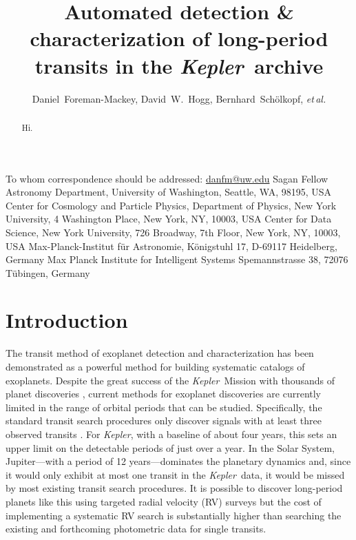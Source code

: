 \documentclass[12pt,preprint]{aastex}
\newcommand{\project}[1]{\textsl{#1}}
\newcommand{\kepler}{\project{Kepler}}
\newcommand{\foreign}[1]{\emph{#1}}
\newcommand{\etal}{\foreign{et\,al.}}
\begin{document}
\title{%
Automated detection \& characterization of long-period transits in the
\kepler\ archive
}

\newcommand{\uw}{3}
\newcommand{\nyu}{4}
\newcommand{\cds}{5}
\newcommand{\mpia}{6}
\newcommand{\mpis}{7}
\author{%
    Daniel~Foreman-Mackey\altaffilmark{1,2,\uw},
    David~W.~Hogg\altaffilmark{\nyu,\mpia,\cds},
    Bernhard~Sch\"olkopf\altaffilmark{\mpis},
    \etal
}
         {To whom correspondence should be addressed:
                          \url{danfm@uw.edu}}
         {Sagan Fellow}
\altaffiltext{\uw}       {Astronomy Department, University of Washington,
                          Seattle, WA, 98195, USA}
\altaffiltext{\nyu}      {Center for Cosmology and Particle Physics,
                          Department of Physics, New York University,
                          4 Washington Place, New York, NY, 10003, USA}
\altaffiltext{\cds}      {Center for Data Science, New York University,
                          726 Broadway, 7th Floor, New York, NY, 10003, USA}
\altaffiltext{\mpia}     {Max-Planck-Institut f\"ur Astronomie,
                          K\"onigstuhl 17, D-69117 Heidelberg, Germany}
\altaffiltext{\mpis}     {Max Planck Institute for Intelligent Systems
                          Spemannstrasse 38, 72076 T\"ubingen, Germany}

\begin{abstract}

Hi.

\end{abstract}


\section{Introduction}

The transit method of exoplanet detection and characterization has been
demonstrated as a powerful method for building systematic catalogs of
exoplanets.
Despite the great success of the \kepler\ Mission with thousands of planet
discoveries \citep{Burke:2014, Rowe:2015}, current methods for exoplanet
discoveries are currently limited in the range of orbital periods that can be
studied.
Specifically, the standard transit search procedures only discover signals
with at least three observed transits \citep[for example][]{Petigura:2013,
Burke:2014, Rowe:2015}.
For \kepler, with a baseline of about four years, this sets an upper limit on
the detectable periods of just over a year.
In the Solar System, Jupiter---with a period of 12 years---dominates the
planetary dynamics and, since it would only exhibit at most one transit in the
\kepler\ data, it would be missed by most existing transit search procedures.
It is possible to discover long-period planets like this using targeted radial
velocity (RV) surveys \citep[for example][]{Butler:2006, Knutson:2014} but the
cost of implementing a systematic RV search is substantially higher than
searching the existing and forthcoming photometric data for single transits.
\end{document}
